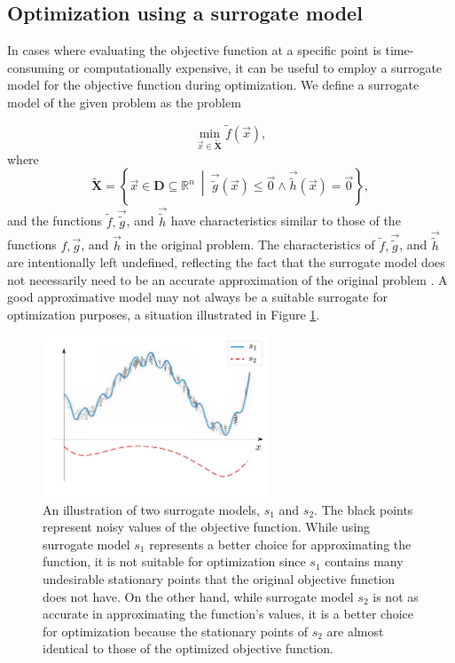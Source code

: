 \subsection{Optimization using a surrogate model}\label{model-based}
In cases where evaluating the objective function at a specific point is time-consuming or computationally expensive, it can be useful to employ a surrogate model for the objective function during optimization. We define a surrogate model of the given problem as the problem

\begin{equation}
	\min_{\vec{x} \in \mathbf{\tilde{X}}} \tilde{f}(\vec{x}),
\end{equation}
where
\begin{equation}
	\mathbf{\tilde{X}} = \left\{ \vec{x} \in \mathbf{D} \subseteq \mathbb{R}^n \ \middle| \ \vec{\tilde{g}} (\vec{x}) \leq \vec{0} \wedge \vec{\tilde{h}} (\vec{x}) = \vec{0} \right\},
\end{equation}
and the functions \( \tilde{f}, \vec{\tilde{g}} \), and \( \vec{\tilde{h}} \) have characteristics similar to those of the functions \( f, \vec{g} \), and \( \vec{h} \) in the original problem. The characteristics of \( \tilde{f}, \vec{\tilde{g}} \), and \( \vec{\tilde{h}} \) are intentionally left undefined, reflecting the fact that the surrogate model does not necessarily need to be an accurate approximation of the original problem \cite{BBO-textbook, two-decades, Kramer2011}. A good approximative model may not always be a suitable surrogate for optimization purposes, a situation illustrated in Figure \ref{fig:surrogate}.

\begin{figure}[H]
	\centering
	\includegraphics[width=0.6\textwidth]{figures/surrogate.pdf}
	\caption{An illustration of two surrogate models, $ s_1 $ and $ s_2 $. The black points represent noisy values of the objective function. While using surrogate model $ s_1 $ represents a better choice for approximating the function, it is not suitable for optimization since $ s_1 $ contains many undesirable stationary points that the original objective function does not have. On the other hand, while surrogate model $ s_2 $ is not as accurate in approximating the function's values, it is a better choice for optimization because the stationary points of $ s_2 $ are almost identical to those of the optimized objective function.}
	\label{fig:surrogate}
\end{figure}

